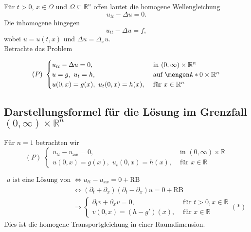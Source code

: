 Für $t>0$, $x \in \Omega$ und $\Omega \subseteq \mathbb{R}^n$ offen lautet die homogene Wellengleichung
\[
	u_{tt} - \Delta u = 0.
\]
Die inhomogene hingegen
\[
	u_{tt} - \Delta u = f,
\]
wobei $u = u(t,x)$ und $ \Delta u = \Delta_x u$. \\
Betrachte das Problem

\[
	(P) \,\, \begin{cases}
		u_{tt} - \Delta u = 0, &\text{ in }(0,\infty) \times \mathbb{R}^n\\
		u = g, \,\, u_t = h ,&\text{ auf } \set{0} \times \mathbb{R}^n \\
		u(0,x) = g(x), \,\, u_t(0,x) = h(x) ,&\text{ für } x \in \mathbb{R}^n
	\end{cases}
\]

 \subsection{Darstellungsformel für die Lösung im Grenzfall $(0,\infty) \times \mathbb{R}^n$} 
 \label{sub:darstellungsformel_fur_die_losung_im_grenzfall}

Für $n=1$ betrachten wir
\[
	(P) \,\, \begin{cases}
		u_{tt}- u_{xx} = 0, &\text{ in }(0,\infty) \times \mathbb{R}\\
		u(0,x) = g(x), \,\,u_t(0,x) = h(x) ,&\text{ für } x \in \mathbb{R}
	\end{cases}
\]

\begin{align*}
u \text{ ist eine Lösung von (P)} &\Leftrightarrow u_{tt}-u_{xx}=0 + \text{RB} \\
& \Leftrightarrow ( \partial_t + \partial_x)( \partial_t - \partial_x)u = 0 + \text{RB} \\
& \Rightarrow \begin{cases}
	\partial_t v + \partial_x v =0, &\text{ für }t>0, x \in \mathbb{R}\\
	v(0,x)= (h-g')(x), &\text{ für }x \in \mathbb{R}
\end{cases}(*)
\end{align*} 
Dies ist die homogene Transportgleichung in einer Raumdimension.

